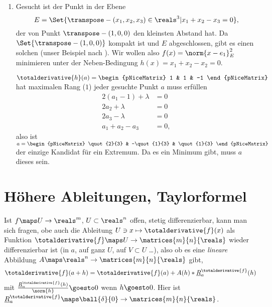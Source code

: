 \begin{beispiele*}
\begin{enumerate}
    \item Gesucht ist der Punkt in der Ebene
    \begin{equation*}
      E=\Set{\transpose-{(x_1,x_2,x_3)}\in \reals^3|x_1+x_2-x_3=0},
    \end{equation*}
    der von Punkt \( \transpose-{(1,0,0)} \) den kleinsten Abstand hat. Da \( \Set{\transpose-{(1,0,0)}} \) kompakt ist und \( E \) abgeschlossen, gibt es einen solchen (\vgl unser Beispiel nach ). Wir wollen also \( f(x)=\norm{x-e_1}_E^2 \) minimieren unter der Neben-Bedingung \( h(x)=x_1+x_2-x_2=0 \).

    \( \totalderivative{h}(a)=\begin{pNiceMatrix} 1 & 1 & -1 \end{pNiceMatrix} \) hat maximalen Rang (\( 1 \)) \dh jeder gesuchte Punkt \( a  \) muss erfüllen
      \begin{align*}
        2(a_1-1)+\lambda&=0\\
        2a_2+\lambda&=0\\
        2a_3-\lambda&=0\\
        a_1+a_2-a_3&=0,
      \end{align*}
    also ist \( a=\begin{pNiceMatrix} \quot{2}{3} & -\quot{1}{3} & \quot{1}{3} \end{pNiceMatrix} \) der einzige Kandidat für ein Extremum. Da es ein Minimum gibt, muss \( a \) dieses sein.
    \end{enumerate}
\end{beispiele*}
\section{Höhere Ableitungen, Taylorformel}
Ist \( f\maps U\to \reals^m \), \( U\subset \reals^n \) offen, stetig differenzierbar, kann man sich fragen, obe auch die Ableitung \( U\ni x\mapsto \totalderivative{f}(x) \) als Funktion \( \totalderivative{f}\maps U\to \matrices{m}{n}{\reals} \) wieder differenzierbar ist (in \( a \), auf ganz \( U \), auf \( V\subset U \) \dots), also ob es eine \emph{lineare} Abbildung \( A\maps \reals^n\to \matrices{m}{n}{\reals} \) gibt, \sd 
\begin{equation*}
  \totalderivative{f}(a+h)=\totalderivative{f}(a)+A(h)*\underline{R}_a^{\totalderivative{f}}(h)
\end{equation*}
mit \( \frac{\underline{R}_a^{\totalderivative{f}}(h)}{\norm{h}}\goesto 0 \) wenn \( h\goesto 0 \). Hier ist \( \underline{R}_a^{\totalderivative{f}}\maps \ball{\delta}{0}\to \matrices{m}{n}{\reals} \). 

